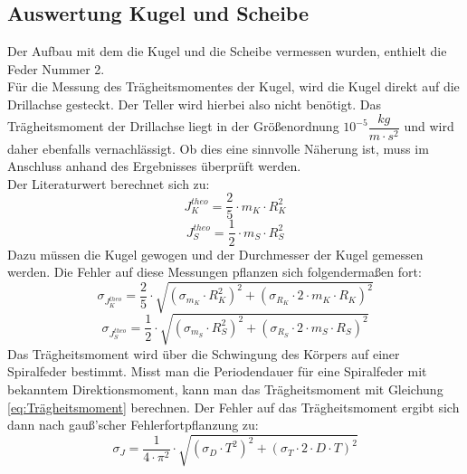 \documentclass[12pt,a4paper]{article}
\begin{document}
\subsection{Auswertung Kugel und Scheibe}
Der Aufbau mit dem die Kugel und die Scheibe vermessen wurden, enthielt die Feder Nummer 2. \\
Für die Messung des Trägheitsmomentes der Kugel, wird die Kugel direkt auf die Drillachse gesteckt. Der Teller wird hierbei also nicht benötigt. Das Trägheitsmoment der Drillachse liegt in der Größenordnung $10^{-5} \dfrac{kg}{m \cdot s^2}$ und wird daher ebenfalls vernachlässigt. Ob dies eine sinnvolle Näherung ist, muss im Anschluss anhand des Ergebnisses überprüft werden. \\
Der Literaturwert berechnet sich zu:
\begin{equation}
J_K^{theo} = \dfrac{2}{5} \cdot m_K \cdot R_K^2
\label{eq:JKtheo}
\end{equation}
\begin{equation}
J_S^{theo} = \dfrac{1}{2} \cdot m_S \cdot R_S^2
\label{eq:JStheo}
\end{equation}
Dazu müssen die Kugel gewogen und der Durchmesser der Kugel gemessen werden. Die Fehler auf diese Messungen pflanzen sich folgendermaßen fort:
\begin{equation}
\sigma_{J_K^{theo}} = \dfrac{2}{5} \cdot \sqrt{\left( \sigma_{m_K} \cdot R_K^2 \right)^2 + \left( \sigma_{R_K} \cdot 2 \cdot m_K \cdot R_K \right)^2}
\label{eq:sigJKtheo}
\end{equation}
\begin{equation}
\sigma_{J_S^{theo}} = \dfrac{1}{2} \cdot \sqrt{\left( \sigma_{m_S} \cdot R_S^2 \right)^2 + \left( \sigma_{R_S} \cdot 2 \cdot m_S \cdot R_S \right)^2}
\label{eq:sigJKtheo}
\end{equation}
Das Trägheitsmoment wird über die Schwingung des Körpers auf einer Spiralfeder bestimmt. Misst man die Periodendauer für eine Spiralfeder mit bekanntem Direktionsmoment, kann man das Trägheitsmoment mit Gleichung \ref{eq:Trägheitsmoment} berechnen. Der Fehler auf das Trägheitsmoment ergibt sich dann nach gauß'scher Fehlerfortpflanzung zu:
\begin{equation}
\sigma_J = \dfrac{1}{4 \cdot \pi^2} \cdot \sqrt{ \left( \sigma_D \cdot T^2 \right)^2 + \left( \sigma_T \cdot 2 \cdot D \cdot T \right)^2}
\label{eq:sigTrägheitsmoment}
\end{equation}
\end{document}
